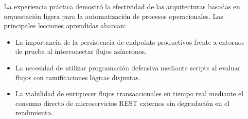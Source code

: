 \documentclass[11pt,letterpaper]{article}
\begin{document}
La experiencia práctica demostró la efectividad de las arquitecturas basadas en orquestación ligera para la automatización de procesos operacionales. Las principales lecciones aprendidas abarcan:
\begin{itemize}
    \item La importancia de la persistencia de endpoints productivos frente a entornos de prueba al interconectar flujos asíncronos.
    \item La necesidad de utilizar programación defensiva mediante scripts al evaluar flujos con ramificaciones lógicas disjuntas.
    \item La viabilidad de enriquecer flujos transaccionales en tiempo real mediante el consumo directo de microservicios REST externos sin degradación en el rendimiento.
\end{itemize}
\end{document}
